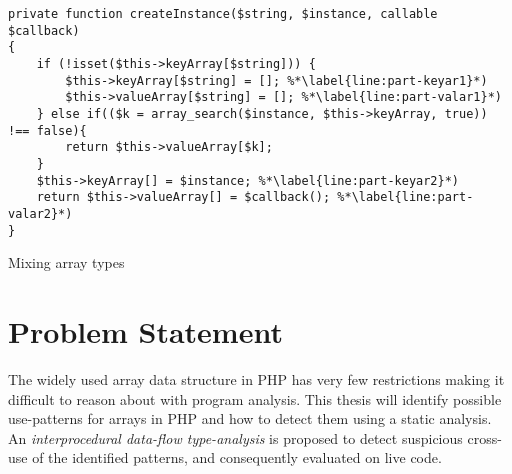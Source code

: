




\begin{program}
\centering 
\begin{lstlisting}
private function createInstance($string, $instance, callable $callback)
{
    if (!isset($this->keyArray[$string])) {
        $this->keyArray[$string] = []; %*\label{line:part-keyar1}*)
        $this->valueArray[$string] = []; %*\label{line:part-valar1}*)
    } else if(($k = array_search($instance, $this->keyArray, true)) !== false){
        return $this->valueArray[$k];
    }
    $this->keyArray[] = $instance; %*\label{line:part-keyar2}*)
    return $this->valueArray[] = $callback(); %*\label{line:part-valar2}*)
}
\end{lstlisting}
\caption{Mixing array types}
\end{program}

\section{Problem Statement}
The widely used array data structure in PHP has very few restrictions making it difficult to reason about with program analysis. This thesis will identify possible use-patterns for arrays in PHP and how to detect them using a static analysis. An \emph{interprocedural data-flow type-analysis} is proposed to detect suspicious cross-use of the identified patterns, and consequently evaluated on live code.

